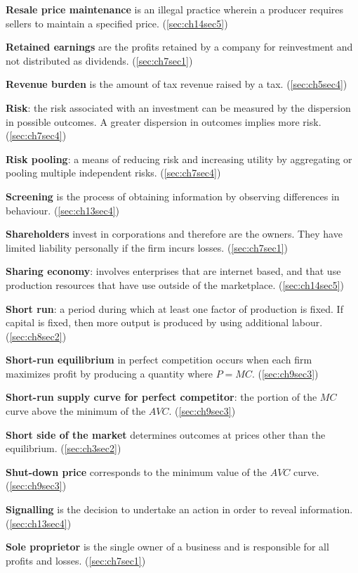 \textbf{Resale price maintenance} is an illegal practice wherein a producer requires sellers to maintain a specified price. (\ref{sec:ch14sec5})

\textbf{Retained earnings} are the profits retained by a company for reinvestment and not distributed as dividends. (\ref{sec:ch7sec1})

\textbf{Revenue burden} is the amount of tax revenue raised by a tax. (\ref{sec:ch5sec4})

\textbf{Risk}: the risk associated with an investment can be measured by the dispersion in possible outcomes. A greater dispersion in outcomes implies more risk. (\ref{sec:ch7sec4})

\textbf{Risk pooling}: a means of reducing risk and increasing utility by aggregating or pooling multiple independent risks. (\ref{sec:ch7sec4})

\textbf{Screening} is the process of obtaining information by observing differences in behaviour. (\ref{sec:ch13sec4})

\textbf{Shareholders} invest in corporations and therefore are the owners. They have limited liability personally if the firm incurs losses. (\ref{sec:ch7sec1})

\textbf{Sharing economy}: involves enterprises that are internet based, and that use production resources that have use outside of the marketplace. (\ref{sec:ch14sec5})

\textbf{Short run}: a period during which at least one factor of production is fixed. If capital is fixed, then more output is produced by using additional labour. (\ref{sec:ch8sec2})

\textbf{Short-run equilibrium} in perfect competition occurs when each firm maximizes profit by producing a quantity where $P=MC$. (\ref{sec:ch9sec3})

\textbf{Short-run supply curve for perfect competitor}: the portion of the $MC$ curve above the minimum of the $AVC$. (\ref{sec:ch9sec3})

\textbf{Short side of the market} determines outcomes at prices other than the equilibrium. (\ref{sec:ch3sec2})

\textbf{Shut-down price} corresponds to the minimum value of the $AVC$ curve. (\ref{sec:ch9sec3})

\textbf{Signalling} is the decision to undertake an action in order to reveal information. (\ref{sec:ch13sec4})

\textbf{Sole proprietor} is the single owner of a business and is responsible for all profits and losses. (\ref{sec:ch7sec1})

